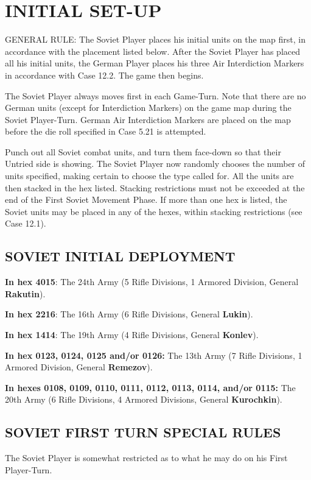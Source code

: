 \section{INITIAL SET-UP}
GENERAL RULE:
The Soviet Player places his initial units on the map first, in accordance with the placement listed below. After the Soviet Player has placed all his initial units, the German Player places his three Air Interdiction Markers in accordance with Case 12.2. The game then begins.

The Soviet Player always moves first in each Game-Turn. Note that there are no German units (except for Interdiction Markers) on the game map during the Soviet Player-Turn. German Air Interdiction Markers are placed on the map before the die roll specified in Case 5.21 is attempted.

Punch out all Soviet combat units, and turn them face-down so that their Untried side is showing. The Soviet Player now randomly chooses the number of units specified, making certain to choose the type called for. All the units are then stacked in the hex listed. Stacking restrictions must not be exceeded at the end of the First Soviet Movement Phase. If more than one hex is listed, the Soviet units may be placed in any of the hexes, within stacking restrictions (see Case 12.1).

\subsection{SOVIET INITIAL DEPLOYMENT}
\textbf{In hex 4015}:
The 24th Army (5 Rifle Divisions, 1 Armored Division, General \textbf{Rakutin}).

\textbf{In hex 2216}:
The 16th Army (6 Rifle Divisions, General \textbf{Lukin}).

\textbf{In hex 1414}:
The 19th Army (4 Rifle Divisions, General \textbf{Konlev}).

\textbf{In hex 0123, 0124, 0125 and/or 0126:}
The 13th Army (7 Rifle Divisions, 1 Armored Division, General \textbf{Remezov}).

\textbf{In hexes 0108, 0109, 0110, 0111, 0112, 0113, 0114, and/or 0115:}
The 20th Army (6 Rifle Divisions, 4 Armored Divisions, General \textbf{Kurochkin}).

\subsection{SOVIET FIRST TURN SPECIAL RULES}

The Soviet Player is somewhat restricted as to what he may do on his First Player-Turn.

